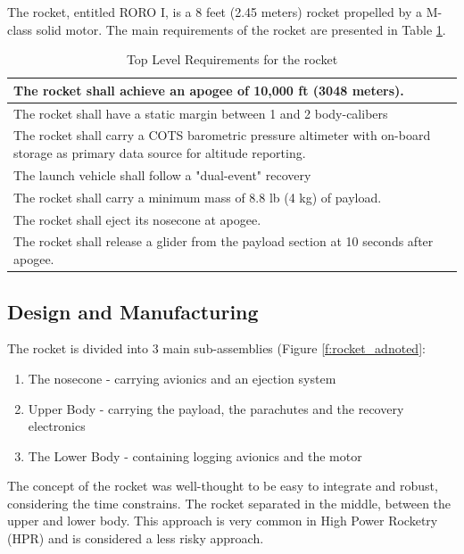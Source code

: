 
The rocket, entitled RORO I, is a 8 feet (2.45 meters) rocket propelled by a M-class solid motor. The main requirements of the rocket are presented in Table \ref{table:se_topLevelR}.

\begin{table}[h!]
\centering
\begin{tabular}{|p{}|}
\hline
    The rocket shall achieve an apogee of 10,000 ft (3048 meters).  \\ \hline
    The rocket shall have a static margin between 1 and 2 body-calibers \\ \hline
    The rocket shall carry a COTS barometric pressure altimeter with on-board storage as primary data source for altitude reporting.  \\ \hline
    The launch vehicle shall follow a "dual-event" recovery \\ \hline
    The rocket shall carry a minimum mass of 8.8 lb (4 kg) of payload. \\ \hline
    The rocket shall eject its nosecone at apogee. \\ \hline
    The rocket shall release a glider from the payload section at 10 seconds after apogee. \\ \hline

\end{tabular}
\caption{Top Level Requirements for the rocket}
\label{table:se_topLevelR}
\end{table}


\subsection{Design and Manufacturing}


The rocket is divided into 3 main sub-assemblies (Figure \ref{f:rocket_adnoted}:
\begin{enumerate}
    \item The nosecone - carrying avionics and an ejection system
    \item Upper Body - carrying the payload, the parachutes and the recovery electronics
    \item The Lower Body - containing logging avionics and the motor
\end{enumerate}
The concept of the rocket was well-thought to be easy to integrate and robust, considering the time constrains. The rocket separated in the middle, between the upper and lower body. This approach is very common in High Power Rocketry (HPR) and is considered a less risky approach.

